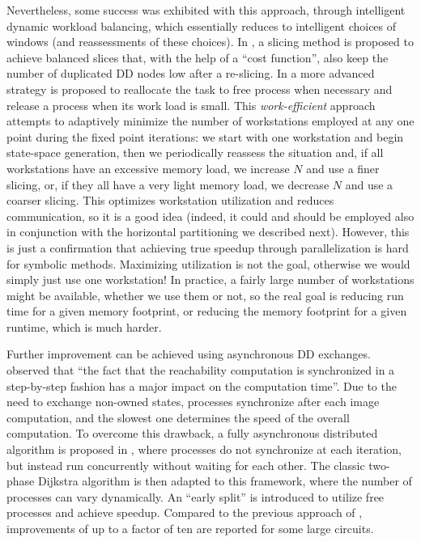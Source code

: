 \documentclass[copyright,creativecommons]{eptcs}
\begin{document}
Nevertheless, some success was exhibited with this approach,
through intelligent dynamic workload balancing, which essentially reduces
to intelligent choices of windows (and reassessments of these choices).
In \cite{Heymann2002fmsd}, a slicing method is proposed to achieve balanced
slices that, with the help of a ``cost function'', also keep the number
of duplicated DD nodes low after a re-slicing.
In \cite{Grumberg2003workefficient} a more advanced strategy is
proposed to reallocate the task to free process when necessary and
release a process when its work load is small. This
\emph{work-efficient} approach attempts to adaptively minimize the
number of workstations employed at any one point during the fixed
point iterations: we start with one workstation and begin
state-space generation, then we periodically reassess the situation
and, if all workstations have an excessive memory load, we increase
$N$ and use a finer slicing, or, if they all have a very light
memory load, we decrease $N$ and use a coarser slicing. This
optimizes workstation utilization and reduces communication, so it
is a good idea (indeed, it could and should be employed also in
conjunction with the horizontal partitioning we described next).
However, this is just a confirmation that achieving true speedup
through parallelization is hard for symbolic methods.
Maximizing utilization is not the
goal, otherwise we would simply just use one workstation! In
practice, a fairly large number of workstations might be available,
whether we use them or not, so the real goal is reducing run time
for a given memory footprint, or reducing the memory footprint for a
given runtime, which is much harder.

Further improvement can be achieved using  asynchronous DD exchanges.
\cite{Grumberg2003workefficient} observed that ``the fact that the reachability
computation is synchronized in a step-by-step fashion
has a major impact on the computation time''.
Due to the need to exchange non-owned states, processes synchronize
after each image computation, and the slowest one determines the speed
of the overall computation.
To overcome this drawback, a fully asynchronous distributed algorithm is
proposed in \cite{Grumberg2005AsynPDSSGEN}, where
processes do not synchronize at each iteration, but instead run
concurrently without waiting for each other.
The classic two-phase Dijkstra algorithm is then adapted to
this framework, where the number of processes can vary dynamically.
An ``early split'' is introduced to utilize free processes and achieve speedup.
Compared to the previous approach of \cite{Grumberg2003workefficient},
improvements of up to a factor of ten are reported for some large circuits.
\end{document}
